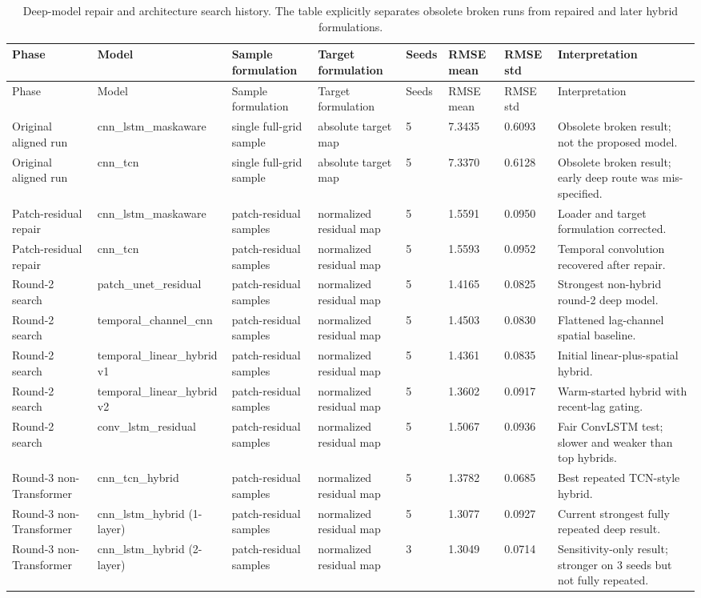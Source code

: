 \documentclass[11pt]{article}
\begin{document}
\begin{landscape}

\begin{longtable}{p{2.5cm}p{2.8cm}p{2.5cm}p{2.4cm}p{0.9cm}p{1.2cm}p{1.2cm}p{3.8cm}}
\caption{Deep-model repair and architecture search history. The table explicitly separates obsolete broken runs from repaired and later hybrid formulations.}\label{tab:t3}\\
\toprule
Phase & Model & Sample formulation & Target formulation & Seeds & RMSE mean & RMSE std & Interpretation \\
\midrule
\endfirsthead
\toprule
Phase & Model & Sample formulation & Target formulation & Seeds & RMSE mean & RMSE std & Interpretation \\
\midrule
\endhead
Original aligned run & cnn\_lstm\_maskaware & single full-grid sample & absolute target map & 5 & 7.3435 & 0.6093 & Obsolete broken result; not the proposed model. \\
Original aligned run & cnn\_tcn & single full-grid sample & absolute target map & 5 & 7.3370 & 0.6128 & Obsolete broken result; early deep route was mis-specified. \\
Patch-residual repair & cnn\_lstm\_maskaware & patch-residual samples & normalized residual map & 5 & 1.5591 & 0.0950 & Loader and target formulation corrected. \\
Patch-residual repair & cnn\_tcn & patch-residual samples & normalized residual map & 5 & 1.5593 & 0.0952 & Temporal convolution recovered after repair. \\
Round-2 search & patch\_unet\_residual & patch-residual samples & normalized residual map & 5 & 1.4165 & 0.0825 & Strongest non-hybrid round-2 deep model. \\
Round-2 search & temporal\_channel\_cnn & patch-residual samples & normalized residual map & 5 & 1.4503 & 0.0830 & Flattened lag-channel spatial baseline. \\
Round-2 search & temporal\_linear\_hybrid v1 & patch-residual samples & normalized residual map & 5 & 1.4361 & 0.0835 & Initial linear-plus-spatial hybrid. \\
Round-2 search & temporal\_linear\_hybrid v2 & patch-residual samples & normalized residual map & 5 & 1.3602 & 0.0917 & Warm-started hybrid with recent-lag gating. \\
Round-2 search & conv\_lstm\_residual & patch-residual samples & normalized residual map & 5 & 1.5067 & 0.0936 & Fair ConvLSTM test; slower and weaker than top hybrids. \\
Round-3 non-Transformer & cnn\_tcn\_hybrid & patch-residual samples & normalized residual map & 5 & 1.3782 & 0.0685 & Best repeated TCN-style hybrid. \\
Round-3 non-Transformer & cnn\_lstm\_hybrid (1-layer) & patch-residual samples & normalized residual map & 5 & 1.3077 & 0.0927 & Current strongest fully repeated deep result. \\
Round-3 non-Transformer & cnn\_lstm\_hybrid (2-layer) & patch-residual samples & normalized residual map & 3 & 1.3049 & 0.0714 & Sensitivity-only result; stronger on 3 seeds but not fully repeated. \\
\bottomrule
\end{longtable}


\end{landscape}
\end{document}
